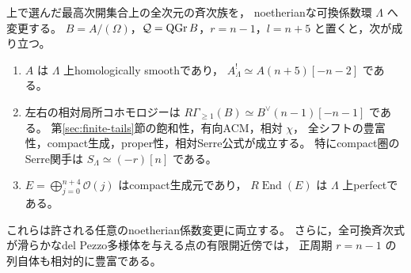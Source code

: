 \begin{theorem}\label{thm:degree-one-relative-tails}
上で選んだ最高次開集合上の全次元の斉次族を，
noetherianな可換係数環 $\Lambda$ へ変更する。
$B=A/(\Omega)$，$\mathcal Q=\operatorname{QGr} B$，$r=n-1$，$l=n+5$ と置くと，次が成り立つ。
\begin{enumerate}
 \item $A$ は $\Lambda$ 上homologically smoothであり，
       $A^!_\Lambda\simeq A(n+5)[-n-2]$ である。
 \item 左右の相対局所コホモロジーは
       $R\Gamma_{\ge1}(B)\simeq B^\vee(n-1)[-n-1]$ である。
       第\ref{sec:finite-tails}節の飽和性，有向ACM，相対 $\chi$，
       全シフトの豊富性，compact生成，proper性，相対Serre公式が成立する。
       特にcompact圏のSerre関手は $S_\Lambda\simeq(-r)[n]$ である。
 \item $E=\bigoplus_{j=0}^{n+4}\mathcal O(j)$ はcompact生成元であり，
       $R\!\operatorname{End}(E)$ は $\Lambda$ 上perfectである。
\end{enumerate}
これらは許される任意のnoetherian係数変更に両立する。
さらに，全可換斉次式が滑らかなdel Pezzo多様体を与える点の有限開近傍では，
正周期 $r=n-1$ の列自体も相対的に豊富である。
\end{theorem}
